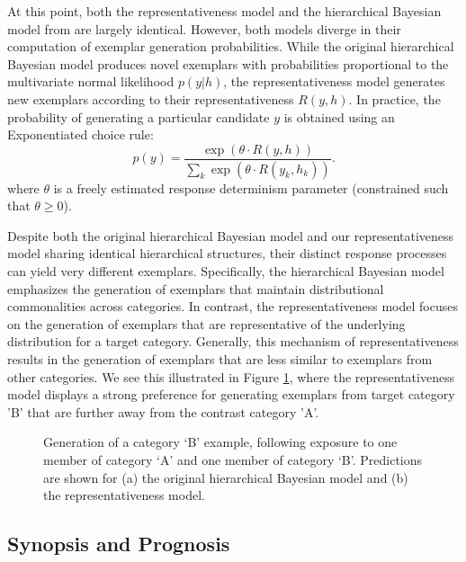 \documentclass[12pt]{article}
\newcommand\inputpgf[2]{{
\let\pgfimageWithoutPath\pgfimage
\renewcommand{\pgfimage}[2][]{\pgfimageWithoutPath[##1]{#1/##2}}

}}
\begin{document}
\begin{flushleft}
At this point, both the representativeness model and the hierarchical Bayesian
model from \cite{jern2013probabilistic} are largely identical. However, both
models diverge in their computation of exemplar generation probabilities. While
the original hierarchical Bayesian model produces novel exemplars with
probabilities proportional to the multivariate normal likelihood $p(y|h)$, the
representativeness model generates new exemplars according to their
representativeness $R(y,h)$. In practice, the probability of generating a
particular candidate $y$ is obtained using an Exponentiated
\citet{luce1977choice} choice rule:
\begin{equation}
  p(y) = \dfrac
    {\exp( \theta \cdot R(y,h))}
    {\sum_k \exp(\theta  \cdot R(y_k,h_k))} .
\label{eq:representative-choice}
\end{equation}
where $\theta$ is a freely estimated response determinism parameter (constrained
such that $\theta \geq 0$).

Despite both the original hierarchical Bayesian model and our representativeness
model sharing identical hierarchical structures, their distinct response
processes can yield very different exemplars. Specifically, the hierarchical
Bayesian model emphasizes the generation of exemplars that maintain
distributional commonalities across categories. In contrast, the
representativeness model focuses on the generation of exemplars that are
representative of the underlying distribution for a target category. Generally,
this mechanism of representativeness results in the generation of exemplars that
are less similar to exemplars from other categories. We see this illustrated in
Figure \ref{fig:representative-examples}, where the representativeness model
displays a strong preference for generating exemplars from target category 'B'
that are further away from the contrast category 'A'.

\begin{figure}
	\begin{center} \inputpgf{figs/}{hbm-examples.pgf}
		\caption{Generation of a category `B' example, following exposure
to one member of category `A' and one member of category `B'. Predictions are
shown for (a) the original hierarchical Bayesian model and (b) the
representativeness model.}
		\label{fig:representative-examples}
	\end{center}
\end{figure}

\subsection{Synopsis and Prognosis}


\end{flushleft}
\end{document}
